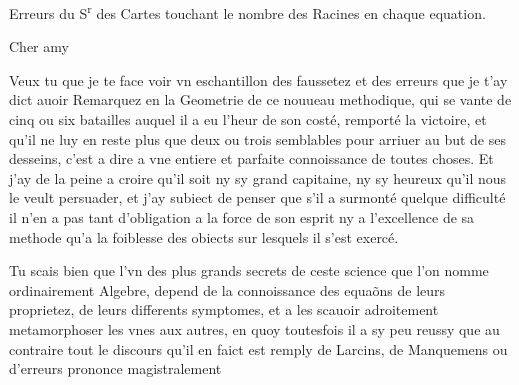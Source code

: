 \documentclass[11pt,a4paper]{article}
\begin{document}
Erreurs du S\textsuperscript{r} des Cartes touchant le nombre des Racines en chaque equation.

Cher amy

Veux tu que je te face voir vn eschantillon des faussetez et des erreurs que je t'ay dict auoir Remarquez en la Geometrie de ce nouueau methodique, qui se vante de cinq ou six batailles auquel il a eu l'heur de son costé, remporté la victoire, et qu'il ne luy en reste plus que deux ou trois semblables pour arriuer au but de ses desseins, c'est a dire a vne entiere et parfaite connoissance de toutes choses. Et  j'ay de la peine a croire qu'il soit ny sy grand capitaine, ny sy heureux qu'il nous le veult persuader, et j'ay subiect de penser que s'il a surmonté quelque  difficulté il  n'en a pas tant d'obligation a la force de son esprit ny a l'excellence de sa methode qu'a la foiblesse des obiects sur lesquels il s'est exercé.

Tu scais bien que l'vn des plus grands secrets de ceste science que l'on nomme ordinairement Algebre, depend de la connoissance des equaõns de leurs proprietez, de leurs differents symptomes, et a les scauoir adroitement metamorphoser les vnes aux autres, en quoy toutesfois il a sy peu reussy que au contraire tout le discours qu'il en  faict est remply de Larcins, de Manquemens ou d'erreurs  \ill{} prononce magistralement
\end{document}
